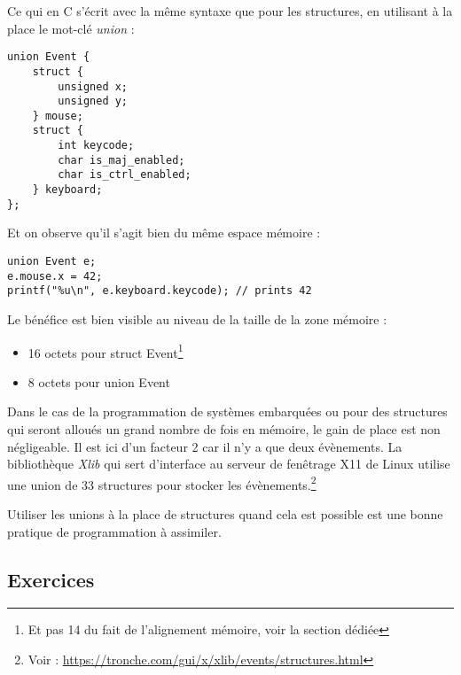 \documentclass[../../../main.tex]{subfiles}
\begin{document}
\begin{minipage}{\textwidth}
	\begin{center}
		
	\end{center}
\end{minipage}

Ce qui en C s’écrit avec la même syntaxe que pour les structures, en utilisant à la place le mot-clé
\textit{union} :
\begin{verbatim}
union Event {
	struct {
		unsigned x;
		unsigned y;
	} mouse;
	struct {
		int keycode;
		char is_maj_enabled;
		char is_ctrl_enabled;
	} keyboard;
};
\end{verbatim}
Et on observe qu’il s’agit bien du même espace mémoire :
\begin{verbatim}
union Event e;
e.mouse.x = 42;
printf("%u\n", e.keyboard.keycode); // prints 42
\end{verbatim}
Le bénéfice est bien visible au niveau de la taille de la zone mémoire :
\begin{itemize}
	\item 16 octets pour \textsf{struct Event}\footnote{Et pas 14 du fait de l’alignement mémoire, voir la section dédiée}
	\item 8 octets pour \textsf{union Event}
\end{itemize}
Dans le cas de la programmation de systèmes embarquées ou pour des structures qui seront alloués un
grand nombre de fois en mémoire, le gain de place est non négligeable. Il est ici d’un facteur 2 car il
n’y a que deux évènements. La bibliothèque \textit{Xlib} qui sert d’interface au serveur de fenêtrage X11 de
Linux utilise une union de 33 structures pour stocker les évènements.\footnote{Voir : \url{https://tronche.com/gui/x/xlib/events/structures.html}}

Utiliser les unions à la place de structures quand cela est possible est une bonne pratique de programmation
à assimiler.
\subsection{Exercices}
\end{document}
